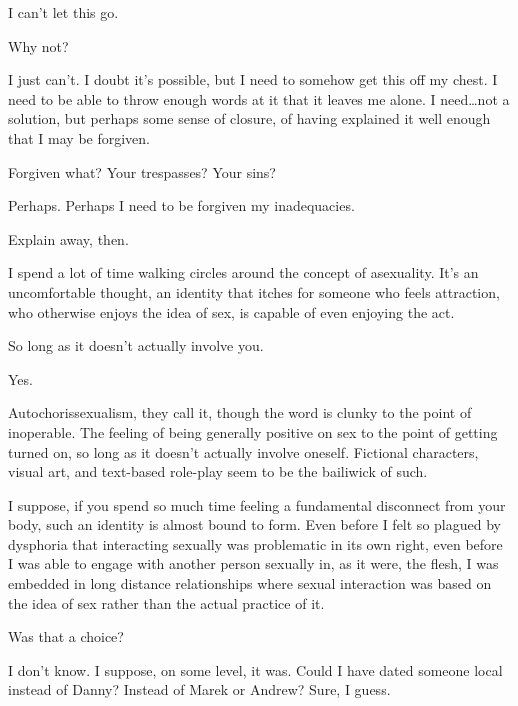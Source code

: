 \begin{paracol}{2}
\begin{rightcolumn*}

\end{rightcolumn*}
\begin{leftcolumn}
  \null
  \newpage
\noindent I can't let this go.

\begin{ally}
Why not?
\end{ally}
I just can't. I doubt it's possible, but I need to somehow get this off my chest. I need to be able to throw enough words at it that it leaves me alone. I need\ldots{}not a solution, but perhaps some sense of closure, of having explained it well enough that I may be forgiven.

\begin{ally}
Forgiven what? Your trespasses? Your sins?
\end{ally}
Perhaps. Perhaps I need to be forgiven my inadequacies.

\begin{ally}
Explain away, then.
\end{ally}
I spend a lot of time walking circles around the concept of asexuality. It's an uncomfortable thought, an identity that itches for someone who feels attraction, who otherwise enjoys the idea of sex, is capable of even enjoying the act.

\begin{ally}
So long as it doesn't actually involve you.
\end{ally}
Yes.

Autochorissexualism, they call it, though the word is clunky to the point of inoperable. The feeling of being generally positive on sex to the point of getting turned on, so long as it doesn't actually involve oneself. Fictional characters, visual art, and text-based role-play seem to be the bailiwick of such.

I suppose, if you spend so much time feeling a fundamental disconnect from your body, such an identity is almost bound to form. Even before I felt so plagued by dysphoria that interacting sexually was problematic in its own right, even before I was able to engage with another person sexually in, as it were, the flesh, I was embedded in long distance relationships where sexual interaction was based on the idea of sex rather than the actual practice of it.

\begin{ally}
Was that a choice?
\end{ally}
I don't know. I suppose, on some level, it was. Could I have dated someone local instead of Danny? Instead of Marek or Andrew? Sure, I guess.


\end{leftcolumn}
\end{paracol}
